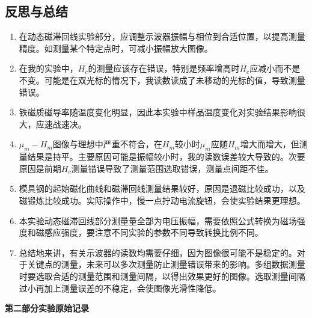 \documentclass[11pt]{article}
\begin{document}
\subsection{反思与总结}
\begin{enumerate}
    \item 在动态磁滞回线实验部分，应调整示波器振幅与相位到合适位置，以提高测量精度。如测量某个特定点时，可减小振幅放大图像。
    \item 在我的实验中，$H_c$的测量应该存在错误，特别是频率增高时$H_c$应减小而不是不变。可能是在双光标的情况下，我读数读成了未移动的光标的值，导致测量错误。
    \item 铁磁质磁导率随温度变化明显，因此本实验中样品温度变化对实验结果影响很大，应速战速决。
    \item $\mu_m - H_m$图像与理想中严重不符合，在$H_m$较小时$\mu_m$应随$H_m$增大而增大，但测量结果是持平。主要原因可能是振幅较小时，我的读数误差较大导致的。次要原因是前期$H_c$测量错误导致了测量范围选取错误，测量点间距不佳。
    \item 模具钢的起始磁化曲线和磁滞回线测量结果较好，原因是退磁比较成功，以及磁锻炼比较成功。实际操作中，慢一点拧动电流旋钮，会使实验结果更理想。
    \item 本实验动态磁滞回线部分测量量全部为电压振幅，需要依照公式转换为磁场强度和磁感应强度，要注意不同实验的参数不同导致转换比例不同。
    \item 总结地来讲，有关示波器的读数均需要仔细，因为图像很可能不是稳定的。对于关键点的测量，未来可以多次测量防止测量错误带来的影响。多组数据测量时要选取合适的测量范围和测量间隔，以得出效果更好的图像。选取测量间隔过小再加上测量误差的不稳定，会使图像光滑性降低。
\end{enumerate}

\begin{center}
    \vspace*{1em}
    \Large \bf 第二部分\qquad 实验原始记录
\end{center}

\end{document}
